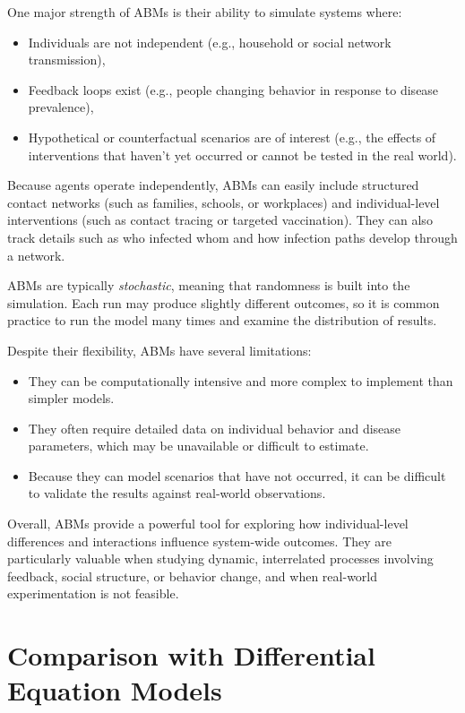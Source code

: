 \documentclass{article}
\begin{document}
One major strength of ABMs is their ability to simulate systems where:
\begin{itemize}
    \item Individuals are not independent (e.g., household or social network transmission),
    \item Feedback loops exist (e.g., people changing behavior in response to disease prevalence),
    \item Hypothetical or counterfactual scenarios are of interest (e.g., the effects of interventions that haven't yet occurred or cannot be tested in the real world).
\end{itemize}

Because agents operate independently, ABMs can easily include structured contact networks (such as families, schools, or workplaces) and individual-level interventions (such as contact tracing or targeted vaccination). They can also track details such as who infected whom and how infection paths develop through a network.

ABMs are typically \emph{stochastic}, meaning that randomness is built into the simulation. Each run may produce slightly different outcomes, so it is common practice to run the model many times and examine the distribution of results.

Despite their flexibility, ABMs have several limitations:
\begin{itemize}
    \item They can be computationally intensive and more complex to implement than simpler models.
    \item They often require detailed data on individual behavior and disease parameters, which may be unavailable or difficult to estimate.
    \item Because they can model scenarios that have not occurred, it can be difficult to validate the results against real-world observations.
\end{itemize}

Overall, ABMs provide a powerful tool for exploring how individual-level differences and interactions influence system-wide outcomes. They are particularly valuable when studying dynamic, interrelated processes involving feedback, social structure, or behavior change, and when real-world experimentation is not feasible.

\section{Comparison with Differential Equation Models}
\end{document}
